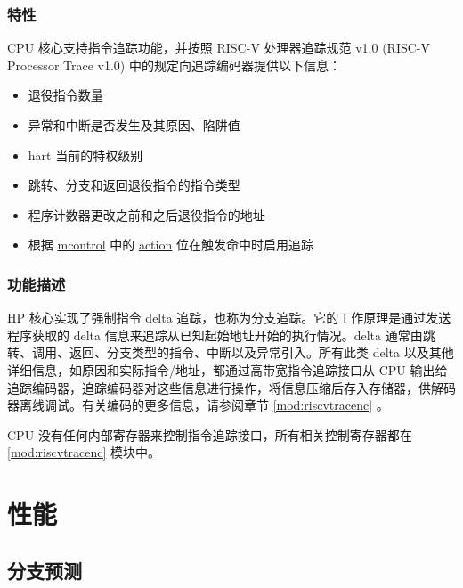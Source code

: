 \documentclass[main\_\_CN.tex]{subfiles}
\begin{document}
\subsubsection{特性}
\label{sec:riscvcpu-trace-features}

CPU 核心支持指令追踪功能，并按照 RISC-V 处理器追踪规范 v1.0 (RISC-V Processor Trace v1.0) 中的规定向追踪编码器提供以下信息：

\begin{itemize}
    \item 退役指令数量
    \item 异常和中断是否发生及其原因、陷阱值
    \item hart 当前的特权级别
    \item 跳转、分支和返回退役指令的指令类型
    \item 程序计数器更改之前和之后退役指令的地址
    \item 根据 \hyperref[regdesc:MCONTROL]{mcontrol} 中的 \hyperref[regdesc:MCONTROL]{action} 位在触发命中时启用追踪
\end{itemize}


\subsubsection{功能描述}
\label{sec:riscvcpu-trace-func-descr}

HP 核心实现了强制指令 delta 追踪，也称为分支追踪。它的工作原理是通过发送程序获取的 delta 信息来追踪从已知起始地址开始的执行情况。delta 通常由跳转、调用、返回、分支类型的指令、中断以及异常引入。所有此类 delta 以及其他详细信息，如原因和实际指令/地址，都通过高带宽指令追踪接口从 CPU 输出给追踪编码器，追踪编码器对这些信息进行操作，将信息压缩后存入存储器，供解码器离线调试。有关编码的更多信息，请参阅章节 \ref{mod:riscvtracenc} \textit{}。

CPU 没有任何内部寄存器来控制指令追踪接口，所有相关控制寄存器都在 \ref{mod:riscvtracenc} \textit{} 模块中。

\newpage
\section{性能}
\label{sec:riscvcpu-perf-enhancements}


\subsection{分支预测}
\label{sec:riscvcpu-perf-bp}
\end{document}

